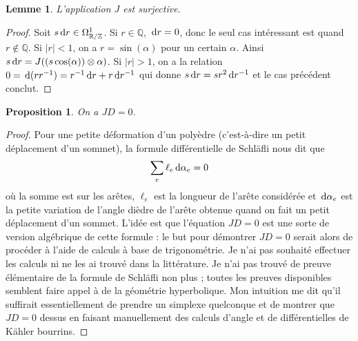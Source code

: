 \documentclass{article}
\newcommand{\Z}{\mathbb{Z}}
\newcommand{\Q}{\mathbb{Q}}
\newcommand{\R}{\mathbb{R}}
\renewcommand{\d}{{\rm \, d}}
\theoremstyle{plain}
\newtheorem{proposition}[theorem]{Proposition}
\newtheorem{lemma}[theorem]{Lemme}
\theoremstyle{definition}
\theoremstyle{remark}
\begin{document}
\begin{lemma}
    L'application $J$ est surjective.
\end{lemma}

\begin{proof}
    Soit $s \d r \in \Omega_{\R/\Z}^1$. Si $r \in \Q$, $\d r =0$, donc le seul cas intéressant est quand $r\notin \Q$. Si $|r| < 1$, on a $r = \sin(\alpha)$ pour un certain $\alpha$. Ainsi $s \d r = J((s \cos(\alpha)) \otimes \alpha)$. Si $|r| > 1$, on a la relation $0 = \d (rr^{-1}) = r^{-1} \d r + r \d r^{-1}$ qui donne $s \d r = s r^2 \d r^{-1}$ et le cas précédent conclut.
\end{proof}

\begin{proposition}
    On a $JD = 0$.
\end{proposition}

\begin{proof}
    Pour une petite déformation d'un polyèdre (c'est-à-dire un petit déplacement d'un sommet), la formule différentielle de Schläfli nous dit que
    \[\sum_e \ell_e \d \alpha_e = 0\]
    où la somme est sur les arêtes, $\ell_e$ est la longueur de l'arête considérée et $\d \alpha_e$ est la petite variation de l'angle dièdre de l'arête obtenue quand on fait un petit déplacement d'un sommet. L'idée est que l'équation $JD = 0$ est une sorte de \og version algébrique \fg de cette formule : le but pour démontrer $JD = 0$ serait alors de procéder à l'aide de calculs à base de trigonométrie. Je n'ai pas souhaité effectuer les calculs ni ne les ai trouvé dans la littérature. Je n'ai pas trouvé de preuve élémentaire de la formule de Schläfli non plus ; toutes les preuves disponibles semblent faire appel à de la géométrie hyperbolique. Mon intuition me dit qu'il suffirait essentiellement de prendre un simplexe quelconque et de montrer que $JD = 0 $ dessus en faisant manuellement des calculs d'angle et de différentielles de Kähler bourrins.
\end{proof}
\end{document}
